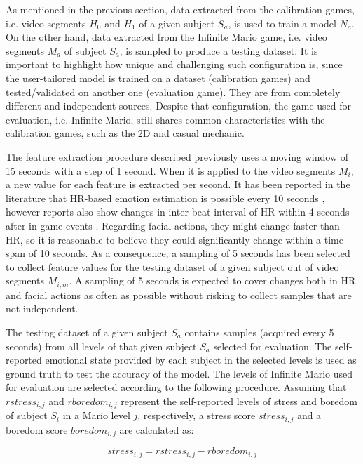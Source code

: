 As mentioned in the previous section, data extracted from the calibration games, i.e. video segments $H_0$ and $H_1$ of a given subject $S_a$, is used to train a model $N_a$. On the other hand, data extracted from the Infinite Mario game, i.e. video segments $M_a$ of subject $S_a$, is sampled to produce a testing dataset. It is important to highlight how unique and challenging such configuration is, since the user-tailored model is trained on a dataset (calibration games) and tested/validated on another one (evaluation game). They are from completely different and independent sources. Despite that configuration, the game used for evaluation, i.e. Infinite Mario, still shares common characteristics with the calibration games, such as the 2D and casual mechanic.

The feature extraction procedure described previously uses a moving window of 15 seconds with a step of 1 second. When it is applied to the video segments $M_i$, a new value for each feature is extracted per second. It has been reported in the literature that HR-based emotion estimation is possible every 10 seconds \parencite{valenza2014revealing}, however reports also show changes in inter-beat interval of HR within 4 seconds after in-game events \parencite{ravaja20051}. Regarding facial actions, they might change faster than HR, so it is reasonable to believe they could significantly change within a time span of 10 seconds. As a consequence, a sampling of 5 seconds has been selected to collect feature values for the testing dataset of a given subject out of video segments $M_{i,m}$. A sampling of 5 seconds is expected to cover changes both in HR and facial actions as often as possible without risking to collect samples that are not independent.

The testing dataset of a given subject $S_a$ contains samples (acquired every 5 seconds) from all levels of that given subject $S_a$ selected for evaluation. The self-reported emotional state provided by each subject in the selected levels is used as ground truth to test the accuracy of the model. The levels of Infinite Mario used for evaluation are selected according to the following procedure. Assuming that $rstress_{i,j}$ and $rboredom_{i,j}$ represent the self-reported levels of stress and boredom of subject $S_i$ in a Mario level $j$, respectively, a stress score $stress_{i,j}$ and a boredom score $boredom_{i,j}$ are calculated as:

\begin{equation}
  stress_{i,j} = rstress_{i,j} - rboredom_{i,j}
  \label{eq:stress-score}
\end{equation}

